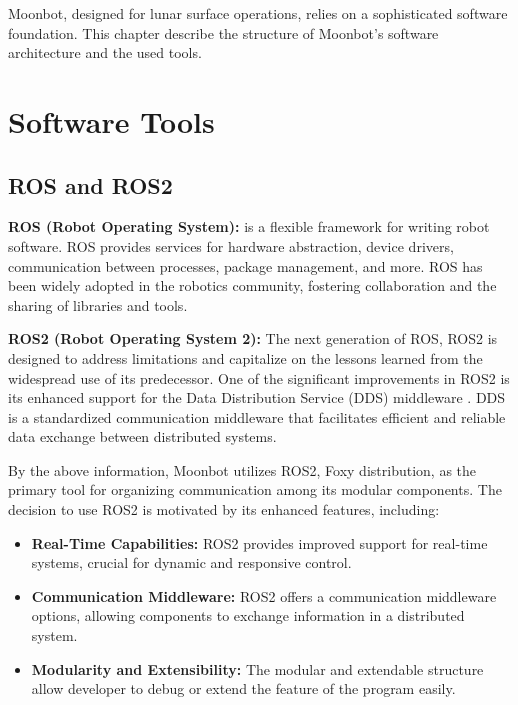 Moonbot, designed for lunar surface operations, relies on a sophisticated software foundation. This chapter describe the structure of Moonbot's software architecture and the used tools.

\section{Software Tools}
\subsection{ROS and ROS2}
\textbf{ROS (Robot Operating System):} \cite{ros} is a flexible framework for writing robot software. ROS provides services for hardware abstraction, device drivers, communication between processes, package management, and more. ROS has been widely adopted in the robotics community, fostering collaboration and the sharing of libraries and tools.

\textbf{ROS2 (Robot Operating System 2):} The next generation of ROS, ROS2 \cite{ros2} is designed to address limitations and capitalize on the lessons learned from the widespread use of its predecessor. One of the significant improvements in ROS2 is its enhanced support for the Data Distribution Service (DDS) middleware \cite{DDS}. DDS is a standardized communication middleware that facilitates efficient and reliable data exchange between distributed systems. 

By the above information, Moonbot utilizes ROS2, Foxy distribution, as the primary tool for organizing communication among its modular components. The decision to use ROS2 is motivated by its enhanced features, including:

\begin{itemize}
\item \textbf{Real-Time Capabilities:} ROS2 provides improved support for real-time systems, crucial for dynamic and responsive control.
\item \textbf{Communication Middleware:} ROS2 offers a communication middleware options, allowing components to exchange information in a distributed system.
\item \textbf{Modularity and Extensibility:} The modular and extendable structure allow developer to debug or extend the feature of the program easily.
\end{itemize}

